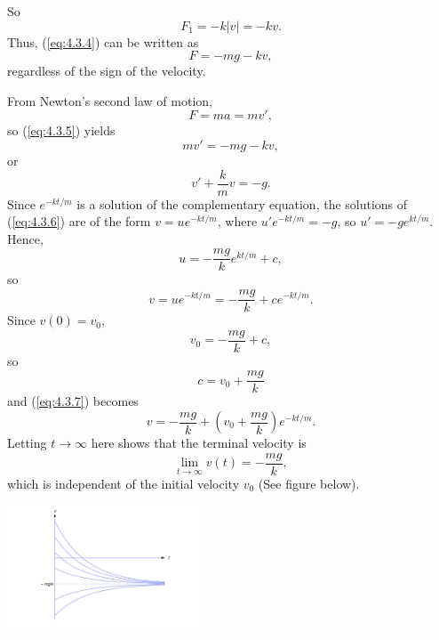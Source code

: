 \documentclass{ximera}
\begin{document}
\begin{example}
\begin{explanation}
So
$$
F_1=-k|v|=-kv.
$$
Thus, (\ref{eq:4.3.4}) can be written as
\begin{equation} \label{eq:4.3.5}
F=-mg-kv,
\end{equation}
regardless of the sign of the velocity.

From Newton's second law of motion,
$$
F=ma=mv',
$$
 so (\ref{eq:4.3.5}) yields
$$
mv'=-mg-kv,
$$
 or
\begin{equation} \label{eq:4.3.6}
v'+\frac{k}{m}v=-g.
\end{equation}
Since $e^{-kt/m}$ is a solution of the  complementary
equation, the solutions of (\ref{eq:4.3.6}) are of the form
$v=ue^{-kt/m}$, where $u'e^{-kt/m}=-g$, so $u'=-ge^{kt/m}$.
Hence,
$$
u=-\frac{mg}{k} e^{kt/m}+c,
$$
so
\begin{equation} \label{eq:4.3.7}
v=ue^{-kt/m}=-\frac{mg}{k}+ce^{-kt/m}.
\end{equation}
Since
 $v(0)=v_0$,
$$
v_0=-\frac{mg}{k}+c,
$$
 so
$$
c=v_0+\frac{mg}{k}
$$
 and (\ref{eq:4.3.7}) becomes
$$
v=-\frac{mg}{k}+\left(v_0+\frac{mg}{k}\right) e^{-kt/m}.
$$
Letting $t\rightarrow\infty$ here shows that the terminal velocity is
$$
\lim_{t\rightarrow\infty} v(t)=-\frac{mg}{k},
$$
which  is independent of the
initial velocity $v_0$ (See figure below).

\begin{image}
  \includegraphics[height=1.5in]{fig040302.jpg} 
\end{image}

\end{explanation}
\end{example}
\end{document}
